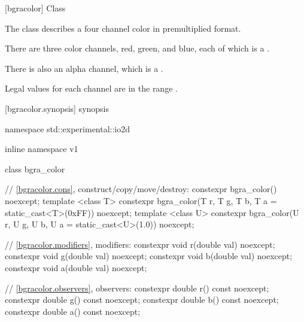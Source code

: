  [bgracolor] {Class }

\pnum
{}
The class  describes a four channel color in premultiplied format.

\pnum
There are three color channels, red, green, and blue, each of which is a .

\pnum
There is also an alpha channel, which is a .

\pnum
Legal values for each channel are in the range .

%
 [bgracolor.synopsis] { synopsis}

\begin{codeblock}
namespace std::experimental::io2d { inline namespace v1 {
  class bgra_color {
    // \ref{bgracolor.cons}, construct/copy/move/destroy:
    constexpr bgra_color() noexcept;
    template <class T>
    constexpr bgra_color(T r, T g, T b, T a = static_cast<T>(0xFF)) noexcept;
    template <class U>
    constexpr bgra_color(U r, U g, U b, U a = static_cast<U>(1.0)) noexcept;
  
    // \ref{bgracolor.modifiers}, modifiers:
    constexpr void r(double val) noexcept;
    constexpr void g(double val) noexcept;
    constexpr void b(double val) noexcept;
    constexpr void a(double val) noexcept;
    
    // \ref{bgracolor.observers}, observers:
    constexpr double r() const noexcept;
    constexpr double g() const noexcept;
    constexpr double b() const noexcept;
    constexpr double a() const noexcept;
    
}}}
\end{codeblock}
